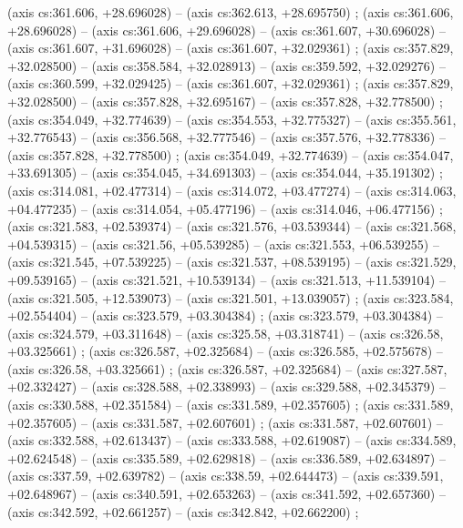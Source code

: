     (axis cs:361.606,    +28.696028) --  (axis cs:362.613,    +28.695750) ;
    (axis cs:361.606,    +28.696028) --  (axis cs:361.606,    +29.696028) --  (axis cs:361.607,    +30.696028) --  (axis cs:361.607,    +31.696028) --  (axis cs:361.607,    +32.029361) ;
    (axis cs:357.829,    +32.028500) --  (axis cs:358.584,    +32.028913) --  (axis cs:359.592,    +32.029276) --  (axis cs:360.599,    +32.029425) --  (axis cs:361.607,    +32.029361) ;
    (axis cs:357.829,    +32.028500) --  (axis cs:357.828,    +32.695167) --  (axis cs:357.828,    +32.778500) ;
    (axis cs:354.049,    +32.774639) --  (axis cs:354.553,    +32.775327) --  (axis cs:355.561,    +32.776543) --  (axis cs:356.568,    +32.777546) --  (axis cs:357.576,    +32.778336) --  (axis cs:357.828,    +32.778500) ;
    (axis cs:354.049,    +32.774639) --  (axis cs:354.047,    +33.691305) --  (axis cs:354.045,    +34.691303) --  (axis cs:354.044,    +35.191302) ;
    (axis cs:314.081,    +02.477314) --  (axis cs:314.072,    +03.477274) --  (axis cs:314.063,    +04.477235) --  (axis cs:314.054,    +05.477196) --  (axis cs:314.046,    +06.477156) ;
    (axis cs:321.583,    +02.539374) --  (axis cs:321.576,    +03.539344) --  (axis cs:321.568,    +04.539315) --  (axis cs:321.56,    +05.539285) --  (axis cs:321.553,    +06.539255) --  (axis cs:321.545,    +07.539225) --  (axis cs:321.537,    +08.539195) --  (axis cs:321.529,    +09.539165) --  (axis cs:321.521,    +10.539134) --  (axis cs:321.513,    +11.539104) --  (axis cs:321.505,    +12.539073) --  (axis cs:321.501,    +13.039057) ;
    (axis cs:323.584,    +02.554404) --  (axis cs:323.579,    +03.304384) ;
    (axis cs:323.579,    +03.304384) --  (axis cs:324.579,    +03.311648) --  (axis cs:325.58,    +03.318741) --  (axis cs:326.58,    +03.325661) ;
    (axis cs:326.587,    +02.325684) --  (axis cs:326.585,    +02.575678) --  (axis cs:326.58,    +03.325661) ;
    (axis cs:326.587,    +02.325684) --  (axis cs:327.587,    +02.332427) --  (axis cs:328.588,    +02.338993) --  (axis cs:329.588,    +02.345379) --  (axis cs:330.588,    +02.351584) --  (axis cs:331.589,    +02.357605) ;
    (axis cs:331.589,    +02.357605) --  (axis cs:331.587,    +02.607601) ;
    (axis cs:331.587,    +02.607601) --  (axis cs:332.588,    +02.613437) --  (axis cs:333.588,    +02.619087) --  (axis cs:334.589,    +02.624548) --  (axis cs:335.589,    +02.629818) --  (axis cs:336.589,    +02.634897) --  (axis cs:337.59,    +02.639782) --  (axis cs:338.59,    +02.644473) --  (axis cs:339.591,    +02.648967) --  (axis cs:340.591,    +02.653263) --  (axis cs:341.592,    +02.657360) --  (axis cs:342.592,    +02.661257) --  (axis cs:342.842,    +02.662200) ;

